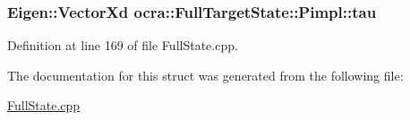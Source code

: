 \subsubsection[{\texorpdfstring{tau}{tau}}]{\setlength{\rightskip}{0pt plus 5cm}Eigen\+::\+Vector\+Xd ocra\+::\+Full\+Target\+State\+::\+Pimpl\+::tau}\hypertarget{structocra_1_1FullTargetState_1_1Pimpl_aae33a52895f1ead1be869d88b3e6ff9f}{}\label{structocra_1_1FullTargetState_1_1Pimpl_aae33a52895f1ead1be869d88b3e6ff9f}


Definition at line 169 of file Full\+State.\+cpp.



The documentation for this struct was generated from the following file\+:\begin{DoxyCompactItemize}
\item 
\hyperlink{FullState_8cpp}{Full\+State.\+cpp}\end{DoxyCompactItemize}
